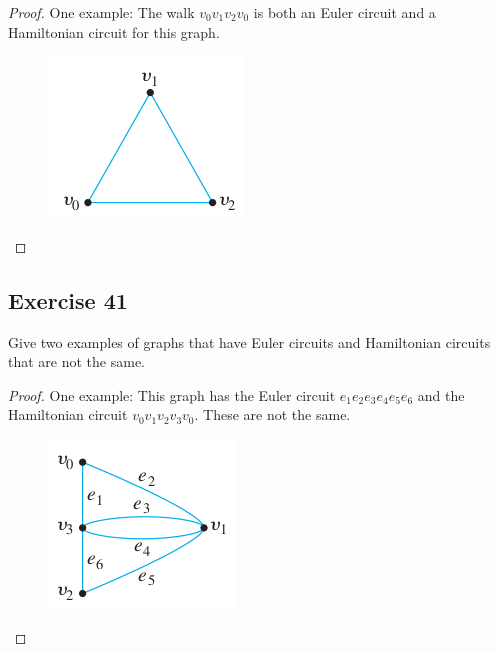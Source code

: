 \documentclass[14pt]{extarticle}
\begin{document}
\begin{proof}
One example: The walk \(v_0v_1v_2v_0\) is both an Euler circuit and a Hamiltonian circuit for this graph.

\begin{figure}[ht!]
\centering
\includegraphics[scale=0.6]{../images/10.1.40.png}
\end{figure}
\end{proof}

\subsection{Exercise 41}
Give two examples of graphs that have Euler circuits and Hamiltonian circuits that are not the same.

\begin{proof}
One example: This graph has the Euler circuit \(e_1e_2e_3e_4e_5e_6\) and the Hamiltonian circuit 
\(v_0v_1v_2v_3v_0\). These are not the same.

\begin{figure}[ht!]
\centering
\includegraphics[scale=0.6]{../images/10.1.41.png}
\end{figure}
\end{proof}
\end{document}

